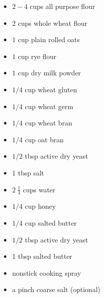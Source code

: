 \documentclass{article}
\begin{document}
\thispagestyle{firstpage}

\ingredients
\renewcommand{\thefootnote}{\alph{footnote}}

\begin{minipage}{\textwidth}
\begin{multicols*}{2}
\begin{minipage}{\linewidth}
\ingredients[Dry]
\vspace{-1em}
\begin{itemize}
    \item $2-4$ cups all purpose flour
    \item $2$ cups whole wheat flour\footnotemark[1]
    \item $1$ cup plain rolled oats
    \item $1$ cup rye flour\footnotemark[2]
    \item $1$ cup dry milk powder
    \item $1/4$ cup wheat gluten
    \item $1/4$ cup wheat germ\footnotemark[3]
    \item $1/4$ cup wheat bran\footnotemark[3]
    \item $1/4$ cup oat bran\footnotemark[3]
    \item $1/2$ tbsp active dry yeast
    \item $1$ tbsp salt
\end{itemize}
\end{minipage}

\columnbreak
\begin{minipage}{\linewidth}
\ingredients[Wet]
\vspace{-1em}
\begin{itemize}
    \item $2~\frac{1}{4}$ cups water
    \item $1/4$ cup honey\footnotemark[4]
    \item $1/4$ cup salted butter
    \item $1/2$ tbsp active dry yeast
\end{itemize}
\ingredients[Miscellaneous]
\vspace{-1em}
\begin{itemize}
    \item 1 tbsp salted butter
    \item nonstick cooking spray
    \item a pinch coarse salt (optional)
\end{itemize}
\end{minipage}
\end{multicols*}
\end{minipage}
\setcounter{footnote}{0}
\vspace{1em}
\end{document}

